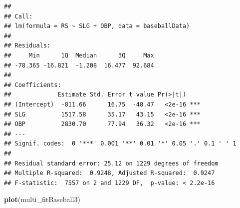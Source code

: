 \documentclass[
]{article}
\newenvironment{Shaded}{\begin{snugshade}}{\end{snugshade}}
\newcommand{\KeywordTok}[1]{\textcolor[rgb]{0.13,0.29,0.53}{\textbf{#1}}}
\newcommand{\NormalTok}[1]{#1}
\begin{document}
\begin{verbatim}
## 
## Call:
## lm(formula = RS ~ SLG + OBP, data = baseballData)
## 
## Residuals:
##     Min      1Q  Median      3Q     Max 
## -78.365 -16.821  -1.208  16.477  92.684 
## 
## Coefficients:
##             Estimate Std. Error t value Pr(>|t|)    
## (Intercept)  -811.66      16.75  -48.47   <2e-16 ***
## SLG          1517.58      35.17   43.15   <2e-16 ***
## OBP          2830.70      77.94   36.32   <2e-16 ***
## ---
## Signif. codes:  0 '***' 0.001 '**' 0.01 '*' 0.05 '.' 0.1 ' ' 1
## 
## Residual standard error: 25.12 on 1229 degrees of freedom
## Multiple R-squared:  0.9248, Adjusted R-squared:  0.9247 
## F-statistic:  7557 on 2 and 1229 DF,  p-value: < 2.2e-16
\end{verbatim}

\begin{Shaded}
\begin{Highlighting}[]
\KeywordTok{plot}\NormalTok{(multi_fitBaseball3)}
\end{Highlighting}
\end{Shaded}
\end{document}
